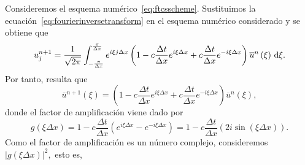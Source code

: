 \begin{frame}
    \begin{example}
        Consideremos el esquema numérico~\eqref{eq:ftcsscheme}.
        Sustituimos la ecuación~\eqref{eq:fourierinversetransform} en el
        esquema numérico considerado y se obtiene que
        \vspace*{-.5\baselineskip}\setlength\belowdisplayshortskip{0pt}
        \begin{equation*}
            u^{n+1}_{j}=
            \frac{1}{\sqrt{2\pi}}
            \int_{-\frac{\pi}{\Delta x}}^{\frac{\pi}{\Delta x}}
            e^{i\xi j \Delta x}
            \left(
            1-c\frac{\Delta t}{\Delta x}
            e^{i \xi \Delta x}+
            c\frac{\Delta t}{\Delta x}
            e^{-i\xi\Delta x}\right)
            \overline{u}^{n}
            \left(\xi\right)
            \dl\xi.
        \end{equation*}
        Por tanto, resulta que
        \vspace*{-.5\baselineskip}\setlength\belowdisplayshortskip{0pt}
        \begin{equation*}
            \bar{u}^{n+1}
            \left(\xi\right)=
            \left(
            1-
            c\frac{\Delta t}{\Delta x}
            e^{i\xi\Delta x}+
            c\frac{\Delta t}{\Delta x}
            e^{-i\xi\Delta x}
            \right)
            \overline{u}^{n}
            \left(\xi\right),
        \end{equation*}
        donde el factor de amplificación viene dado por
        \vspace*{-.5\baselineskip}\setlength\belowdisplayshortskip{0pt}
        \begin{equation*}
            g
            \left(\xi\Delta x\right)=
            1-
            c\frac{\Delta t}{\Delta x}
            \left(
            e^{i\xi\Delta x}-
            e^{-i\xi\Delta x}
            \right)=
            1-
            c\frac{\Delta t}{\Delta x}
            \left(
            2i\sin
            \left(\xi\Delta x\right)
            \right).
        \end{equation*}
        Como el factor de amplificación es un número complejo, consideremos
        \begin{math}
            {\left|
                g\left(\xi\Delta x\right)
                \right|}^{2},
        \end{math}
        esto es,
        \vspace*{-.5\baselineskip}\setlength\belowdisplayshortskip{0pt}

\end{example}
\end{frame}
